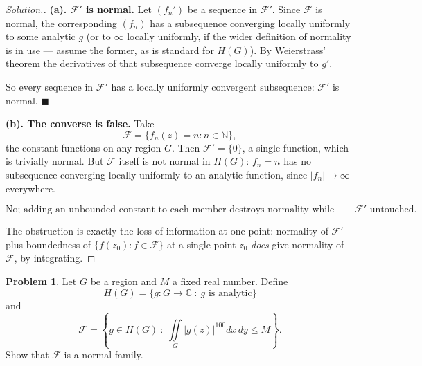\documentclass[11pt,a4paper]{article}
\theoremstyle{definition}
\newtheorem{problemx}{Problem}[section]
\newenvironment{problem}{\begin{problemx}}{\end{problemx}}
\newenvironment{solution}
  {\renewcommand{\qedsymbol}{}\begin{proof}[\textit{Solution}.]}
  {\end{proof}}
\begin{document}
\begin{solution}
\textbf{(a). $\mathcal{F}'$ is normal.} Let $(f_n') $ be a sequence in
$\mathcal{F}'$. Since $\mathcal{F}$ is normal, the corresponding $(f_n)$ has a
subsequence converging locally uniformly to some analytic $g$ (or to $\infty$
locally uniformly, if the wider definition of normality is in use --- assume the
former, as is standard for $H(G)$). By Weierstrass' theorem the derivatives of that
subsequence converge locally uniformly to $g'$.

So every sequence in $\mathcal{F}'$ has a locally uniformly convergent subsequence:
$\mathcal{F}'$ is normal. $\blacksquare$

\textbf{(b). The converse is false.} Take
$$\mathcal{F} = \{f_n(z) = n : n \in \mathbb{N}\},$$
the constant functions on any region $G$. Then $\mathcal{F}' = \{0\}$, a single
function, which is trivially normal. But $\mathcal{F}$ itself is not normal in
$H(G)$: $f_n = n$ has no subsequence converging locally uniformly to an analytic
function, since $\left|f_n\right| \rightarrow \infty$ everywhere.

$$\boxed{\text{No; adding an unbounded constant to each member destroys normality
while leaving } \mathcal{F}' \text{ untouched.}}$$

The obstruction is exactly the loss of information at one point: normality of
$\mathcal{F}'$ plus boundedness of $\{f(z_0) : f \in \mathcal{F}\}$ at a single
point $z_0$ \emph{does} give normality of $\mathcal{F}$, by integrating.
\end{solution}


\begin{problem}
Let $G$ be a region and $M$ a fixed real number. Define
$$H(G) = \{g : G \rightarrow \mathbb{C} \ :\ g \text{ is analytic}\}$$
and
$$\mathcal{F} = \left\{ g \in H(G)\ :\
\iint\limits_{G}\left|g(z)\right|^{100}dx\,dy \leq M \right\}.$$
Show that $\mathcal{F}$ is a normal family.
\end{problem}
\end{document}

